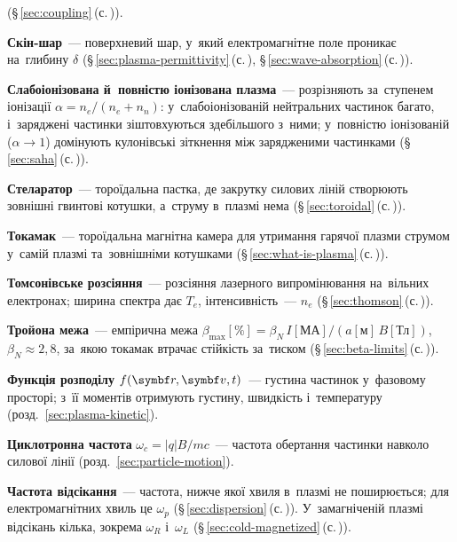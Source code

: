 	  (§\,\ref{sec:coupling}\,(с.\,\pageref{sec:coupling})).
	\item \textbf{Скін-шар}~--- поверхневий шар, у~який електромагнітне поле проникає на~глибину $\delta$
	  (§\,\ref{sec:plasma-permittivity}\,(с.\,\pageref{sec:plasma-permittivity}), §\,\ref{sec:wave-absorption}\,(с.\,\pageref{sec:wave-absorption})).
	\item \textbf{Слабоіонізована й~повністю іонізована плазма}~--- розрізняють за~ступенем іонізації
	  $\alpha=n_e/(n_e+n_n)$: у~слабоіонізованій нейтральних частинок багато, і~заряджені частинки
	  зіштовхуються здебільшого з~ними; у~повністю іонізованій ($\alpha\to1$) домінують кулонівські зіткнення
	  між зарядженими частинками (§\,\ref{sec:saha}\,(с.\,\pageref{sec:saha})).
	\item \textbf{Стеларатор}~--- тороїдальна пастка, де закрутку силових ліній створюють зовнішні гвинтові котушки, а~струму в~плазмі нема (§\,\ref{sec:toroidal}\,(с.\,\pageref{sec:toroidal})).
	\item \textbf{Токамак}~--- тороїдальна магнітна камера для утримання гарячої плазми струмом у~самій плазмі та~зовнішніми котушками
	  (§\,\ref{sec:what-is-plasma}\,(с.\,\pageref{sec:what-is-plasma})).
	\item \textbf{Томсонівське розсіяння}~--- розсіяння лазерного випромінювання на~вільних електронах; ширина спектра дає $T_e$, інтенсивність~--- $n_e$ (§\,\ref{sec:thomson}\,(с.\,\pageref{sec:thomson})).
	\item \textbf{Тройона межа}~--- емпірична межа $\beta_{\max}[\%]=\beta_N\,I[\text{МА}]/(a[\text{м}]\,B[\text{Тл}])$, $\beta_N\approx2{,}8$, за~якою токамак втрачає стійкість за~тиском (§\,\ref{sec:beta-limits}\,(с.\,\pageref{sec:beta-limits})).
	\item \textbf{Функція розподілу} $f(\vect r,\vect v,t)$~--- густина частинок у~фазовому просторі; з~її моментів отримують густину, швидкість і~температуру (розд.~\ref{sec:plasma-kinetic}).
	\item \textbf{Циклотронна частота} $\omega_c=|q|B/mc$~--- частота обертання частинки навколо силової лінії (розд.~\ref{sec:particle-motion}).
	\item \textbf{Частота відсікання}~--- частота, нижче якої хвиля в~плазмі не поширюється; для електромагнітних
	  хвиль це $\omega_p$ (§\,\ref{sec:dispersion}\,(с.\,\pageref{sec:dispersion})).
	  У~замагніченій плазмі відсікань кілька, зокрема $\omega_R$ і~$\omega_L$ (§\,\ref{sec:cold-magnetized}\,(с.\,\pageref{sec:cold-magnetized})).
